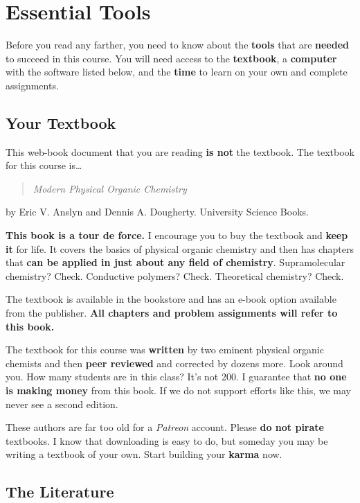 \section{Essential Tools}

Before you read any farther, you need to know about the \textbf{tools} that are \textbf{needed} to succeed in this course. You will need access to the \textbf{textbook}, a \textbf{computer} with the software listed below, and the \textbf{time} to learn on your own and complete assignments.

\subsection{Your Textbook}

This web-book document that you are reading \textbf{is not} the textbook. The textbook for this course is\ldots

\begin{quote}
\textit{Modern Physical Organic Chemistry}
\end{quote}

by Eric V. Anslyn and Dennis A. Dougherty. University Science Books.

\textbf{This book is a tour de force.} I encourage you to buy the textbook and \textbf{keep it} for life. It covers the basics of physical organic chemistry and then has chapters that \textbf{can be applied in just about any field of chemistry}. Supramolecular chemistry? Check. Conductive polymers? Check. Theoretical chemistry? Check.

The textbook is available in the bookstore and has an e-book option available from the publisher. \textbf{All chapters and problem assignments will refer to this book.}

The textbook for this course was \textbf{written} by two eminent physical organic chemists and then \textbf{peer reviewed} and corrected by dozens more. Look around you. How many students are in this class? It's not 200. I guarantee that \textbf{no one is making money} from this book. If we do not support efforts like this, we may never see a second edition.

These authors are far too old for a \emph{Patreon} account. Please \textbf{do not pirate} textbooks. I know that downloading is easy to do, but someday you may be writing a textbook of your own. Start building your \textbf{karma} now.

\subsection{The Literature}

